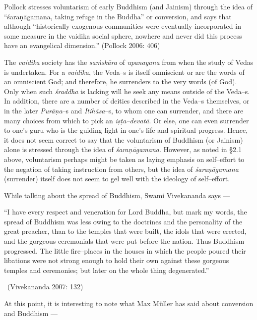 Pollock stresses voluntarism of early Buddhism (and Jainism) through the idea of “śaraṇāgamana, taking refuge in the Buddha” or conversion, and says that although “historically exogenous communities were eventually incorporated in some measure in the vaidika social sphere, nowhere and never did this process have an evangelical dimension.” (Pollock 2006: 406)

The \textit{vaidika} society has the \textit{saṁskāra} of \textit{upanayana} from when the study of Vedas is undertaken. For a \textit{vaidika}, the Veda–s is itself omniscient or are the words of an omniscient God; and therefore, he surrenders to the very words (of God). Only when such \textit{śraddha} is lacking will he seek any means outside of the Veda–s. In addition, there are a number of deities described in the Veda–s themselves, or in the later \textit{Purāṇa}–s and \textit{Itihāsa}–s, to whom one can surrender, and there are many choices from which to pick an \textit{iṣṭa–devatā}. Or else, one can even surrender to one’s guru who is the guiding light in one’s life and spiritual progress. Hence, it does not seem correct to say that the voluntarism of Buddhism (or Jainism) alone is stressed through the idea of \textit{śaraṇāgamana}. However, as noted in §2.1 above, voluntarism perhaps might be taken as laying emphasis on self–effort to the negation of taking instruction from others, but the idea of \textit{śaraṇāgamana} (surrender) itself does not seem to gel well with the ideology of self–effort.

While talking about the spread of Buddhism, Swami Vivekananda says —

\begin{myquote}
“I have every respect and veneration for Lord Buddha, but mark my words, the spread of Buddhism was less owing to the doctrines and the personality of the great preacher, than to the temples that were built, the idols that were erected, and the gorgeous ceremonials that were put before the nation. Thus Buddhism progressed. The little fire–places in the houses in which the people poured their libations were not strong enough to hold their own against these gorgeous temples and ceremonies; but later on the whole thing degenerated.” 

~\hfill (Vivekananda 2007: 132)
\end{myquote}

At this point, it is interesting to note what Max Müller has said about conversion and Buddhism —

